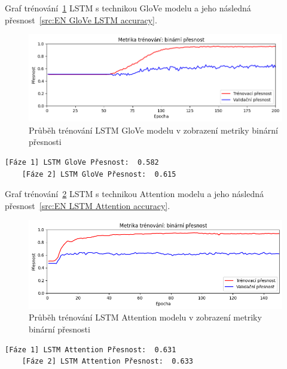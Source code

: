 Graf trénování~\ref{fig:EN LSTM GloVe model train} LSTM s technikou GloVe modelu a jeho následná přesnost~\ref{src:EN GloVe LSTM accuracy}.
\begin{figure}[H]
	\centering
	\includegraphics[width=1\textwidth]{Figures/EN_LSTM_GLOVE_binarni_presnost.png}
	\caption{Průběh trénování LSTM GloVe modelu v zobrazení metriky binární přesnosti}\label{fig:EN LSTM GloVe model train}
\end{figure}
\begin{lstlisting}[label=src:EN GloVe LSTM accuracy, caption={Výsledek GloVe LSTM modelu na anglickém datasetu po trénování~\ref{fig:EN LSTM GloVe model train}}]
	[Fáze 1] LSTM GloVe Přesnost:  0.582
	[Fáze 2] LSTM GloVe Přesnost:  0.615
\end{lstlisting}

Graf trénování~\ref{fig:EN LSTM Attention model train} LSTM s technikou Attention modelu a jeho následná přesnost~\ref{src:EN LSTM Attention accuracy}.
\begin{figure}[H]
	\centering
	\includegraphics[width=1\textwidth]{Figures/EN_LSTM_Attention_binarni_presnost.png}
	\caption{Průběh trénování LSTM Attention modelu v zobrazení metriky binární přesnosti}\label{fig:EN LSTM Attention model train}
\end{figure}
\begin{lstlisting}[label=src:EN LSTM Attention accuracy, caption={Výsledek LSTM Attention modelu na anglickém datasetu po trénování~\ref{fig:EN LSTM Attention model train}}]
	[Fáze 1] LSTM Attention Přesnost:  0.631
	[Fáze 2] LSTM Attention Přesnost:  0.633
\end{lstlisting}


